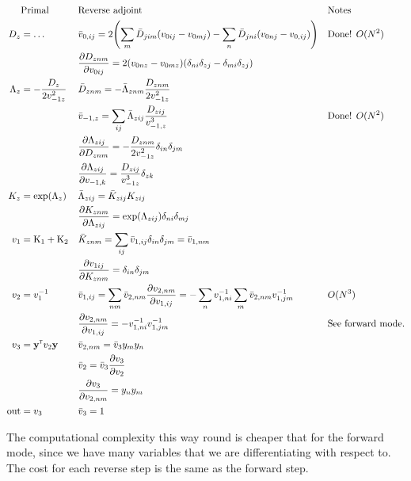 \begin{align}
&\text{Primal} && \text{Reverse adjoint} && \text{Notes} \nonumber \\
D_z &= \dots && \bar v_{0,ij} = 2\left(\sum_{m} \bar D_{jim} (v_{0ij} - v_{0mj}) - \sum_{n} \bar D_{jni} (v_{0nj} - v_{0,ij})\right) && \text{Done! } O(N^2) \\
& && \pderiv[D_{znm}]{v_{0ij}} = 2(v_{0nz} - v_{0mz})(\delta_{ni}\delta_{zj} - \delta_{mi}\delta_{zj}) &&\\
\Lambda_z &= - \frac{D_z}{2v_{-1z}^2} && \bar D_{znm} = -\bar \Lambda_{znm} \frac{D_{znm}}{2v_{-1z}^2} && \\
& && \bar v_{-1,z} = \sum_{ij} \bar \Lambda_{zij} \frac{D_{zij}}{v_{-1,z}^3}  && \text{Done! } O(N^2)  \\
& && \pderiv[\Lambda_{zij}]{D_{znm}} = -\frac{D_{znm}}{2v_{-1z}^2}\delta_{in}\delta_{jm}  && \\
& && \pderiv[\Lambda_{zij}]{v_{-1,k}} = \frac{D_{zij}}{v_{-1z}^3} \delta_{zk} && \\
K_z &= \exp(\Lambda_z) && \bar \Lambda_{zij} = \bar K_{zij} K_{zij} && \\
& && \pderiv[K_{znm}]{\Lambda_{zij}} = \exp(\Lambda_{zij})\delta_{ni}\delta_{mj} && \\
v_1 &= \mat K_1 + \mat K_2 && \bar K_{znm} = \sum_{ij} \bar v_{1,ij} \delta_{in}\delta_{jm} = \bar v_{1,nm} && \\
& && \pderiv[v_{1ij}]{K_{znm}} = \delta_{in}\delta_{jm} && \\
v_2&= v_1\inv && \bar v_{1,ij} = \sum_{nm} \bar v_{2,nm} \pderiv[v_{2,nm}]{v_{1,ij}} = -\sum_{n} v_{1,ni}\inv \sum_m \bar v_{2,nm} v_{1,jm}\inv && O(N^3) \\
& && \pderiv[v_{2,nm}]{v_{1,ij}} = -v_{1,ni}\inv v_{1,jm}\inv && \text{See forward mode.} \\
v_3 &= \vy\transpose v_2 \vy && \bar v_{2,nm} = \bar v_3 y_my_n && \\
& && \bar v_2 = \bar v_3\pderiv[v_3]{v_{2}} && \\
& && \pderiv[v_3]{v_{2,nm}} = y_ny_m  && \\
\text{out} &= v_3 && \bar v_3 = 1 &&
\end{align}

The computational complexity this way round is cheaper that for the forward mode, since we have many variables that we are differentiating with respect to. The cost for each reverse step is the same as the forward step.



